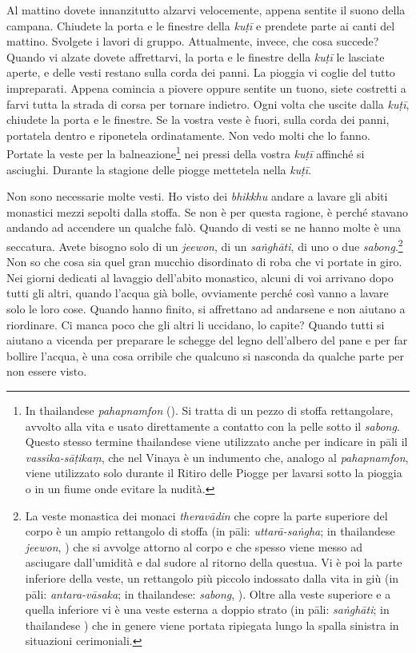Al mattino dovete innanzitutto alzarvi velocemente, appena sentite il
suono della campana. Chiudete la porta e le finestre della \emph{kuṭī} e
prendete parte ai canti del mattino. Svolgete i lavori di gruppo.
Attualmente, invece, che cosa succede? Quando vi alzate dovete
affrettarvi, la porta e le finestre della \emph{kuṭī} le lasciate
aperte, e delle vesti restano sulla corda dei panni. La pioggia vi
coglie del tutto impreparati. Appena comincia a piovere oppure sentite
un tuono, siete costretti a farvi tutta la strada di corsa per tornare
indietro. Ogni volta che uscite dalla \emph{kuṭī}, chiudete la porta e
le finestre. Se la vostra veste è fuori, sulla corda dei panni,
portatela dentro e riponetela ordinatamente. Non vedo molti che lo
fanno. Portate la veste per la balneazione\footnote{In thailandese
  \emph{pahapnamfon} (). Si tratta di un pezzo di stoffa
  rettangolare, avvolto alla vita e usato direttamente a contatto con la
  pelle sotto il \emph{sabong}. Questo stesso termine thailandese viene
  utilizzato anche per indicare in pāli il \emph{vassika-sāṭikaṃ}, che
  nel Vinaya è un indumento che, analogo al \emph{pahapnamfon}, viene
  utilizzato solo durante il Ritiro delle Piogge per lavarsi sotto la
  pioggia o in un fiume onde evitare la nudità.} nei pressi della vostra
\emph{kuṭī} affinché si asciughi. Durante la stagione delle piogge
mettetela nella \emph{kuṭī}.

Non sono necessarie molte vesti. Ho visto dei \emph{bhikkhu} andare a
lavare gli abiti monastici mezzi sepolti dalla stoffa. Se non è per
questa ragione, è perché stavano andando ad accendere un qualche falò.
Quando di vesti se ne hanno molte è una seccatura. Avete bisogno solo di
un \emph{jeewon}, di un \emph{saṅghāti}, di uno o due
\emph{sabong}.\footnote{La veste monastica dei monaci \emph{theravādin}
  che copre la parte superiore del corpo è un ampio rettangolo di stoffa
  (in pāli: \emph{uttarā-saṅgha}; in thailandese \emph{jeewon}, )
  che si avvolge attorno al corpo e che spesso viene messo ad asciugare
  dall'umidità e dal sudore al ritorno della questua. Vi è poi la parte
  inferiore della veste, un rettangolo più piccolo indossato dalla vita
  in giù (in pāli: \emph{antara-vāsaka}; in thailandese: \emph{sabong},
  ). Oltre alla veste superiore e a quella inferiore vi è una veste
  esterna a doppio strato (in pāli: \emph{saṅghāti}; in thailandese
  ) che in genere viene portata ripiegata lungo
  la spalla sinistra in situazioni cerimoniali.} Non so che cosa sia
quel gran mucchio disordinato di roba che vi portate in giro. Nei giorni
dedicati al lavaggio dell'abito monastico, alcuni di voi arrivano dopo
tutti gli altri, quando l'acqua già bolle, ovviamente perché così vanno
a lavare solo le loro cose. Quando hanno finito, si affrettano ad
andarsene e non aiutano a riordinare. Ci manca poco che gli altri li
uccidano, lo capite? Quando tutti si aiutano a vicenda per preparare le
schegge del legno dell'albero del pane e per far bollire l'acqua, è una
cosa orribile che qualcuno si nasconda da qualche parte per non essere
visto.

